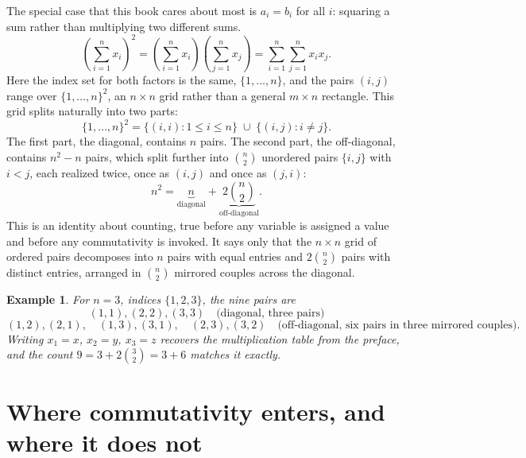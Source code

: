 \documentclass[11pt]{book}
\newtheorem{example}[theorem]{Example}
\begin{document}
The special case that this book cares about most is $a_i = b_i$ for all $i$: squaring a sum rather than multiplying two different sums.
\[
\left(\sum_{i=1}^n x_i\right)^2 = \left(\sum_{i=1}^n x_i\right)\left(\sum_{j=1}^n x_j\right) = \sum_{i=1}^n\sum_{j=1}^n x_ix_j.
\]
Here the index set for both factors is the same, $\{1,\ldots,n\}$, and the pairs $(i,j)$ range over $\{1,\ldots,n\}^2$, an $n\times n$ grid rather than a general $m \times n$ rectangle. This grid splits naturally into two parts:
\[
\{1,\ldots,n\}^2 = \{(i,i) : 1 \le i \le n\} \;\cup\; \{(i,j) : i \ne j\}.
\]
The first part, the diagonal, contains $n$ pairs. The second part, the off-diagonal, contains $n^2 - n$ pairs, which split further into $\binom{n}{2}$ unordered pairs $\{i,j\}$ with $i<j$, each realized twice, once as $(i,j)$ and once as $(j,i)$:
\[
n^2 = \underbrace{n}_{\text{diagonal}} + \underbrace{2\binom{n}{2}}_{\text{off-diagonal}}.
\]
This is an identity about counting, true before any variable is assigned a value and before any commutativity is invoked. It says only that the $n\times n$ grid of ordered pairs decomposes into $n$ pairs with equal entries and $2\binom{n}{2}$ pairs with distinct entries, arranged in $\binom{n}{2}$ mirrored couples across the diagonal.

\begin{example}
For $n=3$, indices $\{1,2,3\}$, the nine pairs are
\[
(1,1),(2,2),(3,3) \quad \text{(diagonal, three pairs)}
\]
\[
(1,2),(2,1),\quad(1,3),(3,1),\quad(2,3),(3,2) \quad \text{(off-diagonal, six pairs in three mirrored couples).}
\]
Writing $x_1=x$, $x_2=y$, $x_3=z$ recovers the multiplication table from the preface, and the count $9 = 3 + 2\binom{3}{2} = 3+6$ matches it exactly.
\end{example}

\section{Where commutativity enters, and where it does not}
\end{document}
